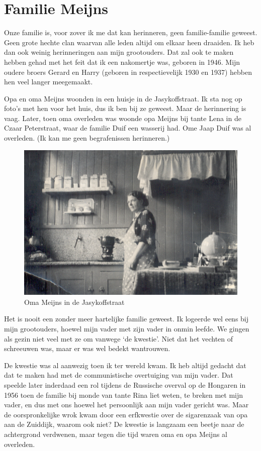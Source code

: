 \documentclass[10pt,twoside, openright]{memoir}
\begin{document}
\thispagestyle{empty}
\section{Familie Meijns} %
\label{cha:familie_meijns}


Onze familie is, voor zover ik me dat kan herinneren, geen familie-familie geweest. Geen grote hechte clan waarvan alle leden altijd om elkaar heen draaiden. Ik heb dan ook weinig herinneringen aan mijn grootouders. Dat zal ook te maken hebben gehad met het feit dat ik een nakomertje was, geboren in 1946. Mijn oudere broers Gerard en Harry (geboren in respectievelijk 1930 en 1937) hebben hen veel langer meegemaakt. 

Opa en oma Meijns woonden in een huisje in de Jasykoffstraat. Ik sta nog op foto’s met hen voor het huis, dus ik ben bij ze geweest. Maar de herinnering is vaag. Later, toen oma overleden was woonde opa Meijns bij tante Lena in de Czaar Peterstraat, waar de familie Duif een wasserij had. Ome Jaap Duif was al overleden. (Ik kan me geen begrafenissen herinneren.)

\begin{figure}
\includegraphics[width=\textwidth]{img/ch1/omaJasykofstr}
\caption*{\footnotesize Oma Meijns in de Jasykoffstraat}
\end{figure}

Het is nooit een zonder meer hartelijke familie geweest. Ik logeerde wel eens bij mijn grootouders, hoewel mijn vader met zijn vader in onmin leefde. We gingen als gezin niet veel met ze om vanwege `de kwestie'. Niet dat het vechten of schreeuwen was, maar er was wel bedekt wantrouwen.

De kwestie was al aanwezig toen ik ter wereld kwam. Ik heb altijd gedacht dat dat te maken had met de communistische overtuiging van mijn vader. Dat speelde later inderdaad een rol tijdens de Russische overval op de Hongaren in 1956 toen de familie bij monde van tante Rina liet weten, te breken met mijn vader, en dus met ons hoewel het persoonlijk aan mijn vader gericht was. Maar de oorspronkelijke wrok kwam door een erfkwestie over de sigarenzaak van opa aan de Zuiddijk, waarom ook niet? De kwestie is langzaam een beetje naar de achtergrond verdwenen, maar tegen die tijd waren oma en opa Meijns al overleden.
\end{document}
